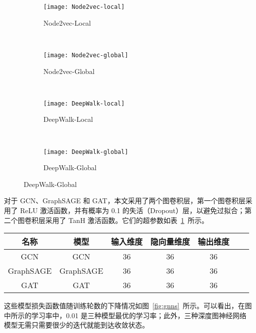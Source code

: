 {\begin{figure}[!htbp]
    \centering
    \begin{subfigure}[b]{0.48\textwidth}
      \texttt{[image: Node2vec-local]}
      \caption{Node2vec-Local}
    \end{subfigure}
    ~
    \begin{subfigure}[b]{0.48\textwidth}
      \texttt{[image: Node2vec-global]}
      \caption{Node2vec-Global}
    \end{subfigure}
    \\
    \begin{subfigure}[b]{0.48\textwidth}
      \texttt{[image: DeepWalk-local]}
      \caption{DeepWalk-Local}
    \end{subfigure}
    ~
    \begin{subfigure}[b]{0.48\textwidth}
      \texttt{[image: DeepWalk-global]}
      \caption{DeepWalk-Global}
    \end{subfigure}
    \label{fig:deep-walk-node2vec}
\end{figure}

对于 GCN、GraphSAGE 和 GAT，本文采用了两个图卷积层，第一个图卷积层采用了 ReLU 激活函数，并有概率为 0.1 的失活（Dropout）层，以避免过拟合；第二个图卷积层采用了 TanH 激活函数。它们的超参数如表~\ref{tab:hyperparameters-gnns}~所示。

\begin{table}[!htbp]
    \label{tab:hyperparameters-gnns}
    \centering
    \footnotesize%
    \setlength{\tabcolsep}{4pt}%
    \renewcommand{\arraystretch}{1.2}%
    \begin{tabular}{ccccccc}
        \hline
        名称 & 模型 & 输入维度 & 隐向量维度 & 输出维度\\
        \hline
        GCN & GCN & 36 & 36 & 36\\
        GraphSAGE & GraphSAGE & 36 & 36 & 36\\
        GAT & GAT & 36 & 36 & 36\\
        \hline
    \end{tabular}
\end{table}

这些模型损失函数值随训练轮数的下降情况如图~\ref{fig:gnns}~所示。可以看出，在图中所示的学习率中，0.01 是三种模型最优的学习率；此外，三种深度图神经网络模型无需只需要很少的迭代就能到达收敛状态。

}
